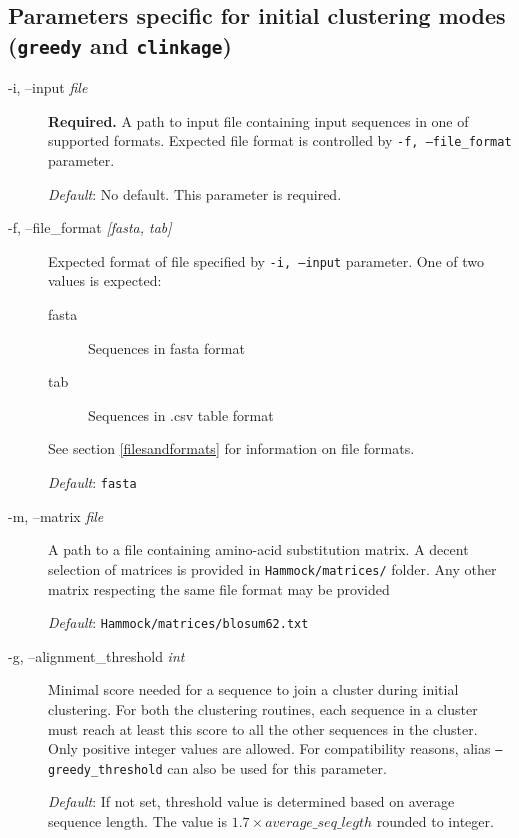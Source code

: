 \documentclass[11pt, a4paper, twoside, titlepage]{article}
\begin{document}
\subsection{Parameters specific for initial clustering modes (\texttt{greedy} and \texttt{clinkage})}
\label{parametersInitial}
\begin{description}


	\item[-i, --input \rm \textlangle \textit{file}\textrangle] \textbf{Required.} A path to input file containing input sequences in one of supported formats. Expected file format is controlled by \texttt{-f, --file\_format} parameter. 
	 
	  \textit{Default}: No default. This parameter is required.

\item[-f, --file\_format \rm \textlangle \textit{[fasta, tab]}\textrangle] Expected format of file specified by \texttt{-i, --input} parameter. One of two values is expected:
\begin{description}
	\item[fasta] Sequences in fasta format
	\item[tab] Sequences in .csv table format
\end{description}
See section \ref{filesandformats} for information on file formats. 

 \textit{Default}: \texttt{fasta}

\item[-m, --matrix \rm \textlangle \textit{file}\textrangle] A path to a file containing amino-acid substitution matrix. A decent selection of matrices is provided in \texttt{Hammock/matrices/} folder. Any other matrix respecting the same file format may be provided 

\textit{Default}: \texttt{Hammock/matrices/blosum62.txt}

\item[-g, --alignment\_threshold \rm \textlangle \textit{int}\textrangle] Minimal score needed for a sequence to join a cluster during initial clustering. For both the clustering routines, each sequence in a cluster must reach at least this score to all the other sequences in the cluster. Only positive integer values are allowed. For compatibility reasons, alias \texttt{--greedy\_threshold} can also be used for this parameter.

\textit{Default}: If not set, threshold value is determined based on average sequence length. The value is $1.7 \times average\_seq\_legth$ rounded to integer.


\end{description}
\end{document}
